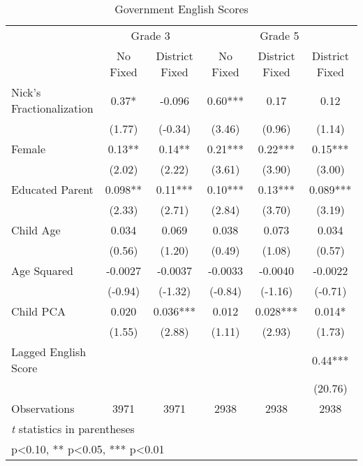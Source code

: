 \begin{table}[htbp]\centering
\def\sym#1{\ifmmode^{#1}\else\(^{#1}\)\fi}
\caption{Government English Scores}
\begin{tabular}{l*{5}{c}}
\toprule
                &\multicolumn{2}{c}{Grade 3}&\multicolumn{3}{c}{Grade 5}           \\\cmidrule(lr){2-3}\cmidrule(lr){4-6}
                &\multicolumn{1}{c}{No Fixed}&\multicolumn{1}{c}{District Fixed}&\multicolumn{1}{c}{No Fixed}&\multicolumn{1}{c}{District Fixed}&\multicolumn{1}{c}{District Fixed}\\
\midrule
Nick's Fractionalization&     0.37*  &   -0.096   &     0.60***&     0.17   &     0.12   \\
                &   (1.77)   &  (-0.34)   &   (3.46)   &   (0.96)   &   (1.14)   \\
Female          &     0.13** &     0.14** &     0.21***&     0.22***&     0.15***\\
                &   (2.02)   &   (2.22)   &   (3.61)   &   (3.90)   &   (3.00)   \\
Educated Parent &    0.098** &     0.11***&     0.10***&     0.13***&    0.089***\\
                &   (2.33)   &   (2.71)   &   (2.84)   &   (3.70)   &   (3.19)   \\
Child Age       &    0.034   &    0.069   &    0.038   &    0.073   &    0.034   \\
                &   (0.56)   &   (1.20)   &   (0.49)   &   (1.08)   &   (0.57)   \\
Age Squared     &  -0.0027   &  -0.0037   &  -0.0033   &  -0.0040   &  -0.0022   \\
                &  (-0.94)   &  (-1.32)   &  (-0.84)   &  (-1.16)   &  (-0.71)   \\
Child PCA       &    0.020   &    0.036***&    0.012   &    0.028***&    0.014*  \\
                &   (1.55)   &   (2.88)   &   (1.11)   &   (2.93)   &   (1.73)   \\
Lagged English Score&            &            &            &            &     0.44***\\
                &            &            &            &            &  (20.76)   \\
\midrule
Observations    &     3971   &     3971   &     2938   &     2938   &     2938   \\
\bottomrule
\multicolumn{6}{l}{\footnotesize \textit{t} statistics in parentheses}\\
\multicolumn{6}{l}{\footnotesize * p<0.10, ** p<0.05, *** p<0.01}\\
\end{tabular}
\end{table}

